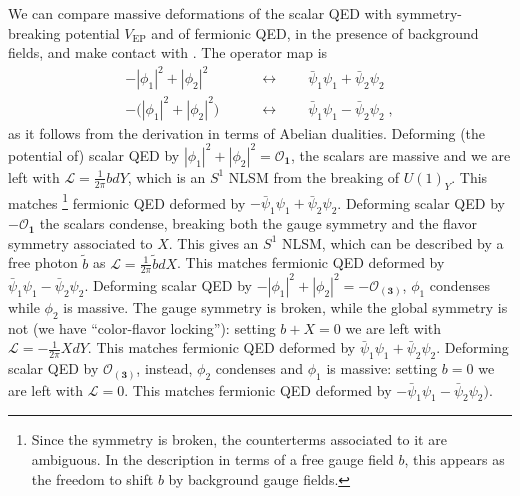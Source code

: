 \documentclass[a4paper, 12pt]{article}
\newcommand{\rep}[1]{\ensuremath{\mathbf{#1}}}
\numberwithin{equation}{section}
\newcommand{\bea}{\begin{equation} \begin{aligned}} \newcommand{\eea}{\end{aligned} \end{equation}}
\newcommand{\cL}{\mathcal{L}}
\newcommand{\cO}{\mathcal{O}}
\begin{document}
We can compare massive deformations of the scalar QED with symmetry-breaking potential $V_\text{EP}$ and of fermionic QED, in the presence of background fields, and make contact with \cite{Benini:2017dus}. The operator map is
\bea
- |\phi_1|^2 + |\phi_2|^2 \qquad&\longleftrightarrow\qquad \bar\psi_1 \psi_1 + \bar\psi_2 \psi_2 \\
- \big( |\phi_1|^2 + |\phi_2|^2\big) \qquad&\longleftrightarrow\qquad \bar\psi_1 \psi_1 - \bar\psi_2 \psi_2 \;,
\eea
as it follows from the derivation in terms of Abelian dualities. Deforming (the potential of) scalar QED by $|\phi_1|^2 + |\phi_2|^2 = \cO_\rep1$, the scalars are massive and we are left with $\cL = \frac1{2\pi} bdY$, which is an $S^1$ NLSM from the breaking of $U(1)_Y$. This matches%
\footnote{Since the symmetry is broken, the counterterms associated to it are ambiguous. In the description in terms of a free gauge field $b$, this appears as the freedom to shift $b$ by background gauge fields.}
fermionic QED deformed by $- \bar\psi_1 \psi_1 + \bar\psi_2 \psi_2$. Deforming scalar QED by $-\cO_\rep1$ the scalars condense, breaking both the gauge symmetry and the flavor symmetry associated to $X$. This gives an $S^1$ NLSM, which can be described by a free photon $\tilde b$ as $\cL = \frac1{2\pi} \tilde b dX$. This matches fermionic QED deformed by $\bar\psi_1 \psi_1 - \bar\psi_2 \psi_2$. Deforming scalar QED by  $- |\phi_1|^2 + |\phi_2|^2 = - \cO_{(\rep3)}$, $\phi_1$ condenses while $\phi_2$ is massive. The gauge symmetry is broken, while the global symmetry is not (we have ``color-flavor locking''): setting $b+X = 0$ we are left with $\cL = - \frac1{2\pi} X dY$.
This matches fermionic QED deformed by $\bar\psi_1 \psi_1 + \bar\psi_2 \psi_2$. Deforming scalar QED by $\cO_{(\rep3)}$, instead, $\phi_2$ condenses and $\phi_1$ is massive: setting $b=0$ we are left with $\cL = 0$. This matches fermionic QED deformed by $-\bar\psi_1 \psi_1 - \bar\psi_2 \psi_2)$.
\end{document}
